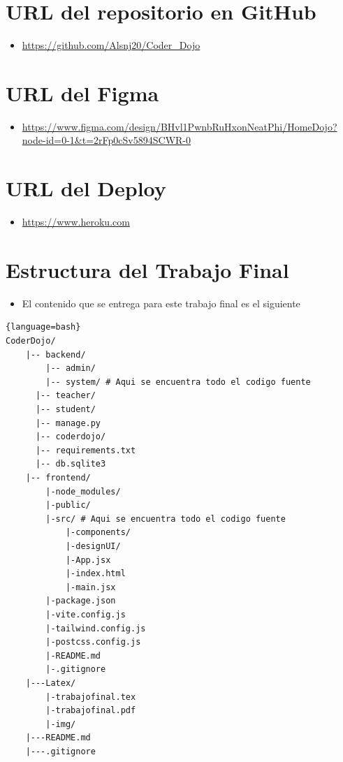 \documentclass{article}
\newcommand{\itemPracticeNumber}{Final}
\begin{document}
\section{URL del repositorio en GitHub}
\begin{itemize}
	\item \url{https://github.com/Alsnj20/Coder_Dojo}
\end{itemize}
\section{URL del Figma}
\begin{itemize}
	\item \url{https://www.figma.com/design/BHvl1PwnbRuHxonNeatPhi/HomeDojo?node-id=0-1&t=2rFp0cSv5894SCWR-0}
\end{itemize}
\section{URL del Deploy}
\begin{itemize}
	\item \url{https://www.heroku.com}
\end{itemize}


\section{Estructura del Trabajo \itemPracticeNumber}
\begin{itemize}
	\item El contenido que se entrega para este trabajo final es el siguiente
\end{itemize}
\begin{lstlisting}{language=bash}
CoderDojo/
	|-- backend/
		|-- admin/
		|-- system/ # Aqui se encuentra todo el codigo fuente
	  |-- teacher/
	  |-- student/
	  |-- manage.py
	  |-- coderdojo/
	  |-- requirements.txt
	  |-- db.sqlite3
	|-- frontend/
		|-node_modules/
		|-public/
		|-src/ # Aqui se encuentra todo el codigo fuente
			|-components/
			|-designUI/
			|-App.jsx
			|-index.html
			|-main.jsx
		|-package.json
		|-vite.config.js
		|-tailwind.config.js
		|-postcss.config.js
		|-README.md
		|-.gitignore
	|---Latex/
		|-trabajofinal.tex
		|-trabajofinal.pdf
		|-img/
	|---README.md
	|---.gitignore
\end{lstlisting}
\end{document}
